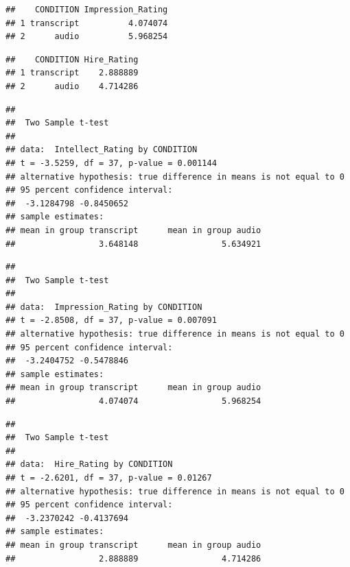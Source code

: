 \documentclass[
  english,
  man]{apa6}
\begin{document}
\begin{verbatim}
##    CONDITION Impression_Rating
## 1 transcript          4.074074
## 2      audio          5.968254
\end{verbatim}

\begin{verbatim}
##    CONDITION Hire_Rating
## 1 transcript    2.888889
## 2      audio    4.714286
\end{verbatim}

\begin{verbatim}
## 
##  Two Sample t-test
## 
## data:  Intellect_Rating by CONDITION
## t = -3.5259, df = 37, p-value = 0.001144
## alternative hypothesis: true difference in means is not equal to 0
## 95 percent confidence interval:
##  -3.1284798 -0.8450652
## sample estimates:
## mean in group transcript      mean in group audio 
##                 3.648148                 5.634921
\end{verbatim}

\begin{verbatim}
## 
##  Two Sample t-test
## 
## data:  Impression_Rating by CONDITION
## t = -2.8508, df = 37, p-value = 0.007091
## alternative hypothesis: true difference in means is not equal to 0
## 95 percent confidence interval:
##  -3.2404752 -0.5478846
## sample estimates:
## mean in group transcript      mean in group audio 
##                 4.074074                 5.968254
\end{verbatim}

\begin{verbatim}
## 
##  Two Sample t-test
## 
## data:  Hire_Rating by CONDITION
## t = -2.6201, df = 37, p-value = 0.01267
## alternative hypothesis: true difference in means is not equal to 0
## 95 percent confidence interval:
##  -3.2370242 -0.4137694
## sample estimates:
## mean in group transcript      mean in group audio 
##                 2.888889                 4.714286
\end{verbatim}
\end{document}
